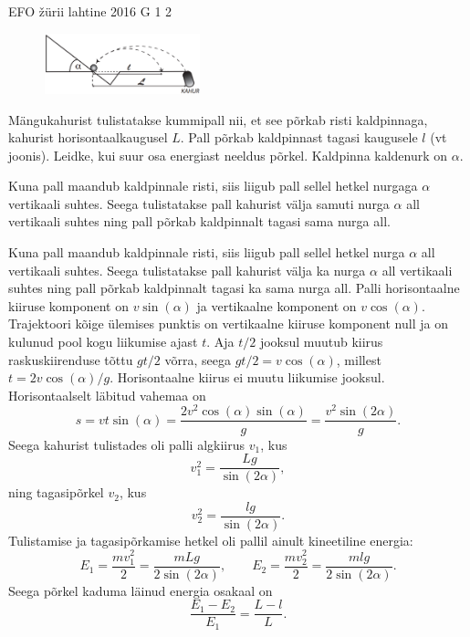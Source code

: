 {EFO žürii} %
{lahtine} %
{2016} %
{G 1} %
{2} %
{
\ifStatement
\begin{figure}
 \vspace{-20pt}
 \begin{center}
 \includegraphics[width=0.4\textwidth]{2016-lahg-01-kaldjoonis}
 \end{center}
 \vspace{-30pt}
\end{figure}

Mängukahurist tulistatakse kummipall nii, et see põrkab risti kaldpinnaga, kahurist horisontaalkaugusel $L$. Pall põrkab kaldpinnast tagasi kaugusele $l$ (vt joonis). Leidke, kui suur osa energiast neeldus põrkel. Kaldpinna kaldenurk on $\alpha$.
\fi


\ifHint
Kuna pall maandub kaldpinnale risti, siis liigub pall sellel hetkel nurgaga $\alpha$ vertikaali suhtes. Seega tulistatakse pall kahurist välja samuti nurga $\alpha$ all vertikaali suhtes ning pall põrkab kaldpinnalt tagasi sama nurga all.
\fi


\ifSolution
Kuna pall maandub kaldpinnale risti, siis liigub pall sellel hetkel nurga $\alpha$ all vertikaali suhtes. Seega tulistatakse pall kahurist välja ka nurga $\alpha$ all vertikaali suhtes ning pall põrkab kaldpinnalt tagasi ka sama nurga all. Palli horisontaalne kiiruse komponent on $v\sin(\alpha)$ ja vertikaalne komponent on $v\cos(\alpha)$. Trajektoori kõige ülemises punktis on vertikaalne kiiruse komponent null ja on kulunud pool kogu liikumise ajast $t$. Aja $t/2$ jooksul muutub kiirus raskuskiirenduse tõttu $gt/2$ võrra, seega $gt/2 =v\cos(\alpha)$, millest $t=2v\cos(\alpha)/g$. Horisontaalne kiirus ei muutu liikumise jooksul. Horisontaalselt läbitud vahemaa on $$s=vt\sin(\alpha)=\frac{2v^2\cos(\alpha)\sin(\alpha)}{g} = \frac{v^2\sin(2\alpha)}{g}.$$
Seega kahurist tulistades oli palli algkiirus $v_1$, kus
\[ v_1^2 = \frac{Lg}{\sin(2\alpha)}, \]
ning tagasipõrkel $v_2$, kus
\[ v_2^2 = \frac{lg}{\sin(2\alpha)}. \]
Tulistamise ja tagasipõrkamise hetkel oli pallil ainult kineetiline energia:
\[ E_1 = \frac{mv_1^2}{2}=\frac{mLg}{2\sin(2\alpha)},\quad\quad E_2 =\frac{mv_2^2}{2} = \frac{mlg}{2\sin(2\alpha)}. \]
Seega põrkel kaduma läinud energia osakaal on
\[ \frac{E_1-E_2}{E_1} = \frac{L-l}{L}. \]
\fi


}
